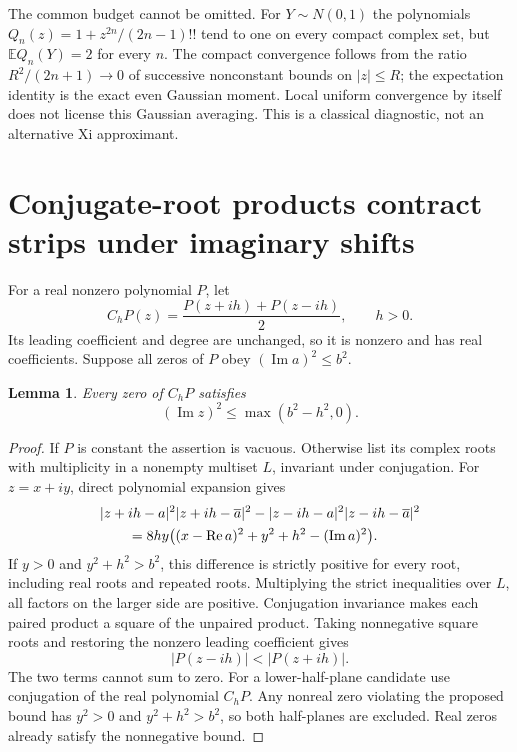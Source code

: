 \documentclass[11pt]{article}
\newtheorem{lemma}[theorem]{Lemma}
\newcommand{\E}{\mathbb E}\newcommand{\norm}[1]{\left\lVert#1\right\rVert}
\begin{document}
The common budget cannot be omitted. For $Y\sim N(0,1)$ the polynomials
$Q_n(z)=1+z^{2n}/(2n-1)!!$ tend to one on every compact complex set,
but $\E Q_n(Y)=2$ for every $n$. The compact convergence follows from
the ratio $R^2/(2n+1)\to0$ of successive nonconstant bounds on $|z|\le R$;
the expectation identity is the exact even Gaussian moment. Local
uniform convergence by itself does not license this Gaussian averaging.
This is a classical diagnostic, not an alternative Xi approximant.

\section{Conjugate-root products contract strips under imaginary shifts}
For a real nonzero polynomial $P$, let
\[
 C_hP(z)=\frac{P(z+ih)+P(z-ih)}2,\qquad h>0.
\]
Its leading coefficient and degree are unchanged, so it is nonzero and
has real coefficients. Suppose all zeros of $P$ obey
$(\operatorname{Im}a)^2\le b^2$.
\begin{lemma}\label{lem:shift}
Every zero of $C_hP$ satisfies
\[
 (\operatorname{Im}z)^2\le\max(b^2-h^2,0).
\]
\end{lemma}
\begin{proof}
If $P$ is constant the assertion is vacuous. Otherwise list its complex
roots with multiplicity in a nonempty multiset $L$, invariant under
conjugation. For $z=x+iy$, direct polynomial expansion gives
\begin{align}\label{eq:pair}
 &|z+ih-a|^2|z+ih-\overline a|^2
       -|z-ih-a|^2|z-ih-\overline a|^2\\
 &\hspace{2em}=8hy\bigl((x-\operatorname{Re}a)^2+y^2+h^2
                                      -(\operatorname{Im}a)^2\bigr).\notag
\end{align}
If $y>0$ and $y^2+h^2>b^2$, this difference is strictly positive for
every root, including real roots and repeated roots. Multiplying the
strict inequalities over $L$, all factors on the larger side are
positive. Conjugation invariance makes each paired product a square
of the unpaired product. Taking nonnegative square roots and restoring
the nonzero leading coefficient gives
\[
 |P(z-ih)|<|P(z+ih)|.
\]
The two terms cannot sum to zero. For a lower-half-plane candidate use
conjugation of the real polynomial $C_hP$. Any nonreal zero violating
the proposed bound has $y^2>0$ and $y^2+h^2>b^2$, so both half-planes
are excluded. Real zeros already satisfy the nonnegative bound.
\end{proof}
\end{document}

